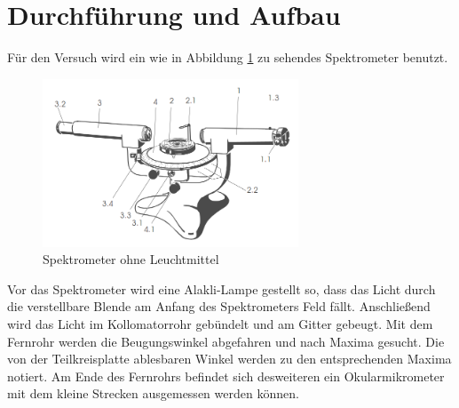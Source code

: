 \section{Durchführung und Aufbau}
\label{sec:Durchführung}
Für den Versuch wird ein wie in Abbildung \ref{fig:Spek} zu sehendes Spektrometer benutzt. 
\begin{figure}
  \centering
  \includegraphics[height=5cm]{picture/Aufbau.png}
  \caption{Spektrometer ohne Leuchtmittel \cite{sample}}
  \label{fig:Spek}
\end{figure}
Vor das Spektrometer wird eine Alakli-Lampe gestellt so, dass das Licht durch die verstellbare Blende am Anfang des Spektrometers Feld fällt. Anschließend wird das Licht im Kollomatorrohr gebündelt und am Gitter gebeugt. Mit dem Fernrohr werden die Beugungswinkel abgefahren und nach Maxima gesucht. Die von der Teilkreisplatte ablesbaren Winkel werden zu den entsprechenden Maxima notiert. Am Ende des Fernrohrs befindet sich desweiteren ein Okularmikrometer mit dem kleine Strecken ausgemessen werden können. 

